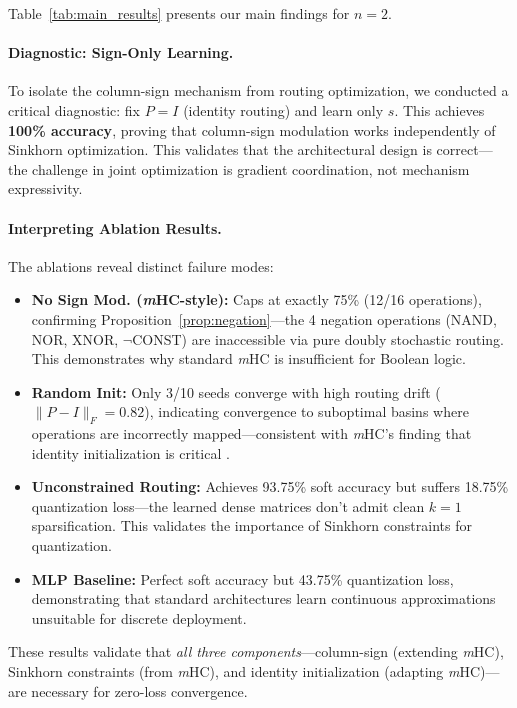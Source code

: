\documentclass[Royal,times,sageh]{sagej}
\newcommand{\mHC}{\textit{m}HC}
\begin{document}
Table~\ref{tab:main_results} presents our main findings for $n=2$.

\paragraph{Diagnostic: Sign-Only Learning.}
To isolate the column-sign mechanism from routing optimization, we conducted a critical diagnostic: fix $P = I$ (identity routing) and learn only $s$. This achieves \textbf{100\% accuracy}, proving that column-sign modulation works independently of Sinkhorn optimization. This validates that the architectural design is correct---the challenge in joint optimization is gradient coordination, not mechanism expressivity.

\paragraph{Interpreting Ablation Results.}
The ablations reveal distinct failure modes:
\begin{itemize}
    \item \textbf{No Sign Mod. (\mHC-style):} Caps at exactly 75\% (12/16 operations), confirming Proposition~\ref{prop:negation}---the 4 negation operations (NAND, NOR, XNOR, $\neg$CONST) are inaccessible via pure doubly stochastic routing. This demonstrates why standard \mHC{} is insufficient for Boolean logic.
    
    \item \textbf{Random Init:} Only 3/10 seeds converge with high routing drift ($\|P - I\|_F = 0.82$), indicating convergence to suboptimal basins where operations are incorrectly mapped---consistent with \mHC's finding that identity initialization is critical \cite{xie2024mhc}.
    
    \item \textbf{Unconstrained Routing:} Achieves 93.75\% soft accuracy but suffers 18.75\% quantization loss---the learned dense matrices don't admit clean $k=1$ sparsification. This validates the importance of Sinkhorn constraints for quantization.
    
    \item \textbf{MLP Baseline:} Perfect soft accuracy but 43.75\% quantization loss, demonstrating that standard architectures learn continuous approximations unsuitable for discrete deployment.
\end{itemize}

These results validate that \textit{all three components}---column-sign (extending \mHC), Sinkhorn constraints (from \mHC), and identity initialization (adapting \mHC)---are necessary for zero-loss convergence.
\end{document}
